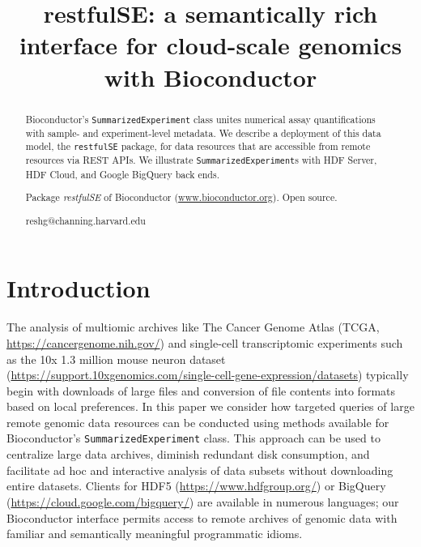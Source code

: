 \documentclass[applications]{gen-bioinformatics}
\author[1]{\pfnm{Shweta}
  \pinit{}
  \psnm{Gopaulakrishnan}}
\author[1]{\pfnm{Samuela}
  \pinit{}
  \psnm{Pollack}}
\author[1]{\pfnm{Benjamin}
  \pinit{}
  \psnm{Stubbs}}
\author[2]{\pfnm{Herv\'e}
  \pinit{}
  \psnm{Pag\`es}}
\author[3]{\pfnm{John}
  \pinit{}
  \psnm{Readey}}
\author[4]{\pfnm{Sean}
  \pinit{}
  \psnm{Davis}}
\author[5]{\pfnm{Levi}
  \pinit{}
  \psnm{Waldron}}
\author[6]{\pfnm{Martin}
  \pinit{T}
  \psnm{Morgan}}
\author[1]{\pfnm{Vincent}
  \pinit{J}
  \psnm{Carey}}
\newcommand{\Rpackage}[1]{{\textit{#1}}}
\begin{document}
\title{restfulSE: a semantically rich interface for cloud-scale genomics
with Bioconductor}
\maketitle

\begin{abstract}
\begin{subabstract}[Summary]
Bioconductor's \verb+SummarizedExperiment+ class unites numerical
assay quantifications with sample- and experiment-level metadata.  We
describe a deployment of this data model, the \verb+restfulSE+ package, for data resources that are
accessible from remote resources via REST APIs.  We illustrate
\verb+SummarizedExperiment+s with HDF Server, HDF Cloud, and Google
BigQuery back ends.
\end{subabstract}
\begin{subabstract}[Availability] Package \Rpackage{restfulSE} of Bioconductor
 (\url {www.bioconductor.org}). Open source.
\end{subabstract}
\begin{subabstract}[Contact]reshg@channing.harvard.edu
\end{subabstract}
\end{abstract}
\section*{Introduction}

The analysis of multiomic archives like The Cancer Genome Atlas (TCGA, \url{https://cancergenome.nih.gov/})
and single-cell transcriptomic experiments such as the 10x 1.3 million
mouse neuron dataset (\url{https://support.10xgenomics.com/single-cell-gene-expression/datasets}) typically begin with downloads of large files and
conversion of file contents into formats based on local preferences.
In this paper we consider how targeted queries of large remote genomic
data resources can be conducted using methods available for
Bioconductor's \verb+SummarizedExperiment+ class.  This approach can
be used to centralize large data archives, diminish redundant disk
consumption, and facilitate ad hoc and interactive analysis of data
subsets without downloading entire datasets. Clients for
HDF5 (\url{https://www.hdfgroup.org/}) or BigQuery (\url{https://cloud.google.com/bigquery/}) are available in numerous languages; our
Bioconductor interface permits access to remote archives of genomic
data with familiar and semantically meaningful programmatic idioms.
\end{document}
